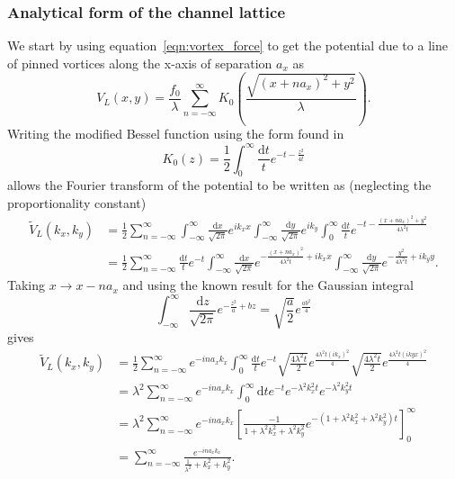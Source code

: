\documentclass{article}
\numberwithin{equation}{section}
\begin{document}
\subsubsection{Analytical form of the channel lattice} \label{sec:analytic_chan}
We start by using equation~\ref{eqn:vortex_force} to get the potential due to a line of pinned vortices along the x-axis of separation $a_x$ as \cite{Watkins2016DensitySuperconductors}
\begin{equation}
    V_L(x, y) = \frac{f_0}{\lambda}\sum_{n=-\infty}^\infty K_0 \left( \frac{\sqrt{(x + na_x)^2 + y^2}}{\lambda} \right).
\end{equation}
Writing the modified Bessel function using the form found in \cite{I.S.Gradshteyn2015TableProducts}
\begin{equation}
    K_0(z) = \frac{1}{2}\int_0^\infty \frac{\mathrm{d}t}{t}e^{-t-\frac{z^2}{4t}}
\end{equation}
allows the Fourier transform of the potential to be written as (neglecting the proportionality constant)
\begin{align*}
    \tilde{V}_L(k_x, k_y) &= \frac{1}{2}\sum_{n=-\infty}^\infty \int_{-\infty}^\infty\frac{\mathrm{d}x}{\sqrt{2\pi}}e^{ik_xx} \int_{-\infty}^\infty\frac{\mathrm{d}y}{\sqrt{2\pi}}e^{ik_y} \int_0^\infty\frac{\mathrm{d}t}{t}e^{-t-\frac{(x+na_x)^2 + y^2}{4\lambda^2t}} \\
    &= \frac{1}{2}\sum_{n=-\infty}^\infty \frac{\mathrm{d}t}{t}e^{-t} \int_{-\infty}^\infty\frac{\mathrm{d}x}{\sqrt{2\pi}}e^{-\frac{(x+na_x)^2}{4\lambda^2t}+ik_xx}
    \int_{-\infty}^\infty\frac{\mathrm{d}y}{\sqrt{2\pi}}e^{-\frac{y^2}{4\lambda^2t}+ik_yy}.
\end{align*}
Taking $x \rightarrow x - na_x$ and using the known result for the Gaussian integral
\begin{equation}
    \int_{-\infty}^\infty\frac{\mathrm{d}z}{\sqrt{2\pi}}e^{-\frac{z^2}{a}+bz} = \sqrt{\frac{a}{2}}e^{\frac{ab^2}{4}}
\end{equation}
gives
\begin{align*}
    \tilde{V}_L(k_x, k_y) &= \frac{1}{2}\sum_{n=-\infty}^\infty e^{-ina_xk_x} \int_0^\infty\frac{\mathrm{d}t}{t}e^{-t} \sqrt{\frac{4\lambda^2t}{2}}e^{\frac{4\lambda^2t(ik_x)^2}{4}} \sqrt{\frac{4\lambda^2t}{2}}e^{\frac{4\lambda^2t(ikyx)^2}{4}} \\
    &= \lambda^2\sum_{n=-\infty}^\infty e^{-ina_xk_x} \int_0^\infty\mathrm{d}te^{-t}e^{-\lambda^2k_x^2t}e^{-\lambda^2k_y^2t} \\
    &= \lambda^2\sum_{n=-\infty}^\infty e^{-ina_xk_x} \left[\frac{-1}{1+\lambda^2k_x^2+\lambda^2k_y^2} e^{-\left(1+\lambda^2k_x^2+\lambda^2k_y^2\right)t}\right]_0^\infty\ \\
    &= \sum_{n=-\infty}^\infty \frac{e^{-ina_xk_x}}{\frac{1}{\lambda^2}+k_x^2+k_y^2}.
\end{align*}
\end{document}

